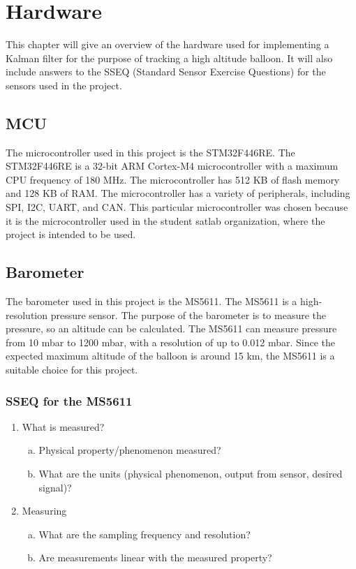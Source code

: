\chapter{Hardware}\label{ch:hardware}
This chapter will give an overview of the hardware used for implementing a Kalman filter for the purpose of tracking a high altitude balloon.
It will also include answers to the SSEQ (Standard Sensor Exercise Questions) for the sensors used in the project.

\section{MCU}\label{sec:mcu}
The microcontroller used in this project is the STM32F446RE. The STM32F446RE is a 32-bit ARM Cortex-M4 microcontroller with a maximum CPU frequency of 180 MHz. 
The microcontroller has 512 KB of flash memory and 128 KB of RAM. 
The microcontroller has a variety of peripherals, including SPI, I2C, UART, and CAN. 
This particular microcontroller was chosen because it is the microcontroller used in the student satlab organization, where the project is intended to be used. 

\section{Barometer}\label{sec:barometer}
The barometer used in this project is the MS5611. 
The MS5611 is a high-resolution pressure sensor. The purpose of the barometer is to measure the pressure, so an altitude can be calculated.
The MS5611 can measure pressure from 10 mbar to 1200 mbar, with a resolution of up to 0.012 mbar. %
Since the expected maximum altitude of the balloon is around 15 km, the MS5611 is a suitable choice for this project.

\subsection{SSEQ for the MS5611}
\begin{enumerate}
    \item What is measured?
        \begin{enumerate}[(a)]
            \item Physical property/phenomenon measured?
            \item What are the units (physical phenomenon, output from sensor, desired signal)?
        \end{enumerate}

    \item Measuring
        \begin{enumerate}[(a)]
            \item What are the sampling frequency and resolution?
            \item Are measurements linear with the measured property?
        \end{enumerate}
            
    
\end{enumerate}






